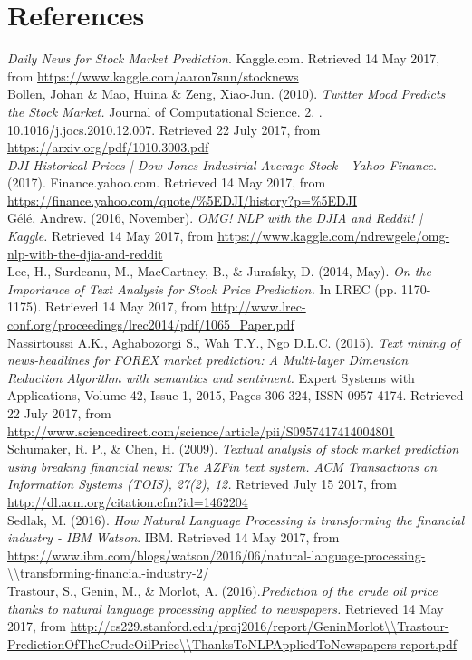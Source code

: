 \documentclass[11pt,a4paper]{article}
\begin{document}
\section{References}


\textit{Daily News for Stock Market Prediction}. Kaggle.com. Retrieved 14 May 2017, from \url{https://www.kaggle.com/aaron7sun/stocknews}\\

Bollen, Johan \& Mao, Huina \& Zeng, Xiao-Jun. (2010). \textit{Twitter Mood Predicts the Stock Market.} Journal of Computational Science. 2. . 10.1016/j.jocs.2010.12.007. Retrieved 22 July 2017, from \url{https://arxiv.org/pdf/1010.3003.pdf}\\


\textit{DJI Historical Prices | Dow Jones Industrial Average Stock - Yahoo Finance}. (2017). Finance.yahoo.com. Retrieved 14 May 2017, from \url{https://finance.yahoo.com/quote/\%5EDJI/history?p=\%5EDJI}\\

G\'el\'e, Andrew. (2016, November). \textit{OMG! NLP with the DJIA and Reddit! | Kaggle.} Retrieved 14 May 2017, from \url{https://www.kaggle.com/ndrewgele/omg-nlp-with-the-djia-and-reddit}\\

Lee, H., Surdeanu, M., MacCartney, B., \& Jurafsky, D. (2014, May). \textit{On the Importance of Text Analysis for Stock Price Prediction.} In LREC (pp. 1170-1175). Retrieved 14 May 2017, from \url{http://www.lrec-conf.org/proceedings/lrec2014/pdf/1065_Paper.pdf}\\

Nassirtoussi A.K., Aghabozorgi S., Wah T.Y., Ngo D.L.C. (2015). \textit{Text mining of news-headlines for FOREX market prediction: A Multi-layer Dimension Reduction Algorithm with semantics and sentiment.} Expert Systems with Applications, Volume 42, Issue 1, 2015, Pages 306-324, ISSN 0957-4174. Retrieved 22 July 2017, from \url{http://www.sciencedirect.com/science/article/pii/S0957417414004801}\\

Schumaker, R. P., \& Chen, H. (2009). \textit{Textual analysis of stock market prediction using breaking financial news: The AZFin text system. ACM Transactions on Information Systems (TOIS), 27(2), 12.} Retrieved July 15 2017, from \url{http://dl.acm.org/citation.cfm?id=1462204}\\


Sedlak, M. (2016). \textit{How Natural Language Processing is transforming the financial industry - IBM Watson}. IBM. Retrieved 14 May 2017, from \url{https://www.ibm.com/blogs/watson/2016/06/natural-language-processing-\\transforming-financial-industry-2/}\\

Trastour, S., Genin, M., \& Morlot, A. (2016).\textit{Prediction of the crude oil price thanks to natural language processing applied to newspapers.} Retrieved 14 May 2017, from \url{http://cs229.stanford.edu/proj2016/report/GeninMorlot\\Trastour-PredictionOfTheCrudeOilPrice\\ThanksToNLPAppliedToNewspapers-report.pdf}\\
\end{document}
